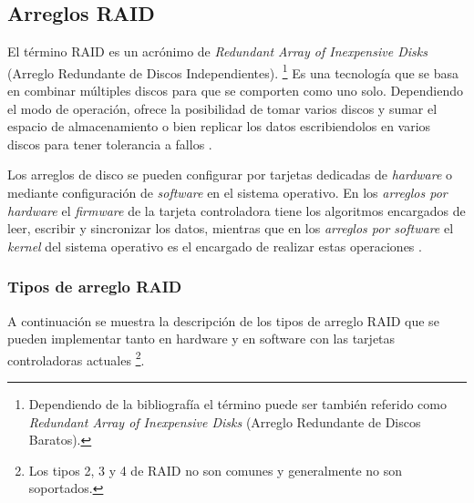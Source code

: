 \newpage
  \subsection {Arreglos RAID}
  \label{Arreglos-RAID}

El t\'{e}rmino \textsc{RAID} es un acr\'{o}nimo de \emph{Redundant Array of Inexpensive Disks} (Arreglo Redundante de Discos Independientes). \footnote{Dependiendo de la bibliograf\'{i}a el t\'{e}rmino puede ser tambi\'{e}n referido como \emph{Redundant Array of Inexpensive Disks} (Arreglo Redundante de Discos Baratos).} \cite{_bytepile.com_????} Es una tecnolog\'{i}a que se basa en combinar m\'{u}ltiples discos para que se comporten como uno solo. Dependiendo el modo de operaci\'{o}n, ofrece la posibilidad de tomar varios discos y sumar el espacio de almacenamiento o bien replicar los datos escribiendolos en varios discos para tener tolerancia a fallos \cite{_raid_????-2}.

Los arreglos de disco se pueden configurar por tarjetas dedicadas de \textit{hardware} o mediante configuraci\'{o}n de \textit{software} en el sistema operativo. En los \emph{arreglos por \textit{hardware}} el \textit{firmware} de la tarjeta controladora tiene los algoritmos encargados de leer, escribir y sincronizar los datos, mientras que en los \emph{arreglos por software} el \textit{kernel} del sistema operativo es el encargado de realizar estas operaciones \cite{_chapter_????}.

\subsubsection*{Tipos de arreglo RAID}

A continuaci\'{o}n se muestra la descripci\'{o}n de los tipos de arreglo \textsc{RAID} que se pueden implementar tanto en hardware y en software con las tarjetas controladoras actuales \footnote{Los tipos 2, 3 y 4 de \textsc{RAID} no son comunes y generalmente no son soportados.}.

